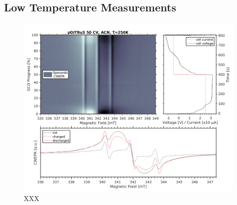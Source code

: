\subsection{Low Temperature Measurements}
\begin{figure}[h]
\center
	\includegraphics[width=1\textwidth]{./operando_epr/figures/slowcharge_231117_liquid_250K.pdf}
	\caption{XXX}
	\label{fig:operando_cold_cycle}
\end{figure}

